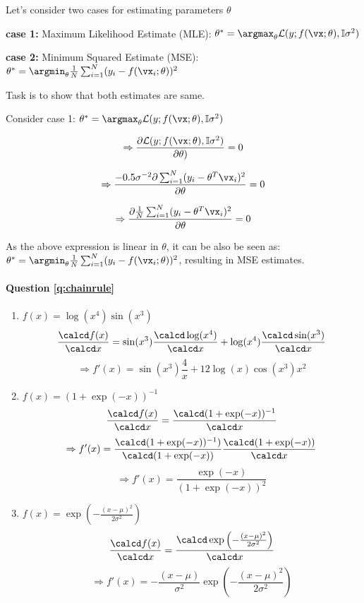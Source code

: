 Let's consider two cases for estimating parameters $\theta$

\textbf{case 1:} Maximum Likelihood Estimate (MLE): 
$\theta^* = \argmax_{\theta} \mathcal{L}(y; f(\vx; \theta), \mathbb{I}\sigma^2)$

\textbf{case 2:} Minimum Squared Estimate (MSE):
$\theta^* = \argmin_{\theta} \frac{1}{N}\sum_{i=1}^N(y_i - f(\vx_i; \theta))^2$

Task is to show that both estimates are same.



Consider case 1: $\theta^* = \argmax_{\theta} \mathcal{L}(y; f(\vx; \theta), \mathbb{I}\sigma^2)$

$$ \Rightarrow \frac{\partial \mathcal{L}(y; f(\vx; \theta), \mathbb{I}\sigma^2)}{\partial \theta)} = 0 $$


$$ \Rightarrow \frac{-0.5\sigma^{-2}\partial \sum_{i=1}^N (y_i - \theta^T\vx_i)^2}{\partial \theta} = 0 $$

$$ \Rightarrow \frac{\partial \frac{1}{N}\sum_{i=1}^N (y_i - \theta^T\vx_i)^2}{\partial \theta} = 0 $$

As the above expression is linear in $\theta$, it can be also be seen as: $\theta^* = \argmin_{\theta} \frac{1}{N}\sum_{i=1}^N(y_i - f(\vx_i; \theta))^2$, resulting in MSE estimates.




\paragraph{Question \ref{q:chainrule}}
\begin{enumerate}[label=\alph*.]
\item $f(x) = \log (x^4) \sin (x^3)$
        $$\frac{\calcd f(x)}{\calcd x} = \sin(x^3) \frac{\calcd \log(x^4)}{\calcd x} + \log (x^4)\frac{\calcd \sin(x^3)}{\calcd x}$$
        $$\Rightarrow f'(x) = \sin(x^3)\frac{4}{x} + 12\log(x)\cos(x^3)x^2$$
        
\item $f(x) = (1 + \exp(-x))^{-1}$
         $$\frac{\calcd f(x)}{\calcd x} = \frac{\calcd (1 + \exp(-x))^{-1}}{\calcd x}$$
         $$\Rightarrow f'(x) = \frac{\calcd (1 + \exp(-x))^{-1})}{\calcd(1 + \exp(-x))} \frac{\calcd(1 + \exp(-x))}{\calcd x}$$
         $$\Rightarrow f'(x) = \frac{\exp(-x)}{(1 + \exp(-x))^2}$$
        
\item $f(x) = \exp\left(-\frac{(x-\mu)^2}{2\sigma^2}\right)$
         $$\frac{\calcd f(x)}{\calcd x} = \frac{\calcd \exp\left(-\frac{(x-\mu)^2}{2\sigma^2}\right)}{\calcd x}$$
         $$\Rightarrow f'(x) = -\frac{(x-\mu)}{\sigma^2}\exp\left(-\frac{(x-\mu)^2}{2\sigma^2}\right)$$

\end{enumerate}
